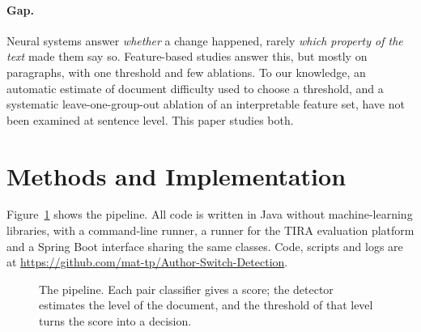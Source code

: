 \documentclass[runningheads]{llncs}
\begin{document}
\paragraph{Gap.} Neural systems answer \emph{whether} a change happened, rarely \emph{which property of the text} made them say so. Feature-based studies answer this, but mostly on paragraphs, with one threshold and few ablations. To our knowledge, an automatic estimate of document difficulty used to choose a threshold, and a systematic leave-one-group-out ablation of an interpretable feature set, have not been examined at sentence level. This paper studies both.

\section{Methods and Implementation}
\label{sec:methods}

Figure~\ref{fig:pipeline} shows the pipeline. All code is written in Java without machine-learning libraries, with a command-line runner, a runner for the TIRA evaluation platform and a Spring Boot interface sharing the same classes. Code, scripts and logs are at \url{https://github.com/mat-tp/Author-Switch-Detection}.

\begin{figure}[t]
\centering
{}
\caption{The pipeline. Each pair classifier gives a score; the detector estimates the level of the document, and the threshold of that level turns the score into a decision.}
\label{fig:pipeline}
\end{figure}
\end{document}
